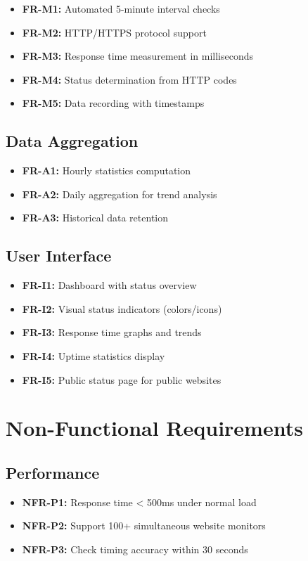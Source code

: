 \begin{itemize}
    \item \textbf{FR-M1:} Automated 5-minute interval checks
    \item \textbf{FR-M2:} HTTP/HTTPS protocol support
    \item \textbf{FR-M3:} Response time measurement in milliseconds
    \item \textbf{FR-M4:} Status determination from HTTP codes
    \item \textbf{FR-M5:} Data recording with timestamps
\end{itemize}

\subsection{Data Aggregation}

\begin{itemize}
    \item \textbf{FR-A1:} Hourly statistics computation
    \item \textbf{FR-A2:} Daily aggregation for trend analysis
    \item \textbf{FR-A3:} Historical data retention
\end{itemize}

\subsection{User Interface}

\begin{itemize}
    \item \textbf{FR-I1:} Dashboard with status overview
    \item \textbf{FR-I2:} Visual status indicators (colors/icons)
    \item \textbf{FR-I3:} Response time graphs and trends
    \item \textbf{FR-I4:} Uptime statistics display
    \item \textbf{FR-I5:} Public status page for public websites
\end{itemize}

\section{Non-Functional Requirements}

\subsection{Performance}
\begin{itemize}
    \item \textbf{NFR-P1:} Response time < 500ms under normal load
    \item \textbf{NFR-P2:} Support 100+ simultaneous website monitors
    \item \textbf{NFR-P3:} Check timing accuracy within 30 seconds
\end{itemize}

